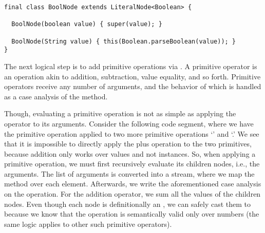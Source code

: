 \begin{lstlisting}[language=MyJava]
final class BoolNode extends LiteralNode<Boolean> {

  BoolNode(boolean value) { super(value); }

  BoolNode(String value) { this(Boolean.parseBoolean(value)); }
}
\end{lstlisting}

The next logical step is to add primitive operations via . 
A primitive operator is an operation akin to addition, subtraction, value equality, and so forth. 
Primitive operators receive any number of arguments, and the behavior of which is handled as a case analysis of the  method. 

Though, evaluating a primitive operation is not as simple as applying the operator to its arguments. 
Consider the following code segment, where we have the primitive operation \ttt{+} applied to two more primitive operations `\ttt{*}' and `\ttt{-}.' 
We see that it is impossible to directly apply the plus operation to the two primitives, because addition only works over  values and not  instances. 
So, when applying a primitive operation, we must first recursively evaluate its children nodes, i.e., the arguments. 
The list of arguments is converted into a stream, where we map the  method over each element. 
Afterwards, we write the aforementioned case analysis on the operation. 
For the addition operator, we sum all the values of the children nodes. 
Even though each node is definitionally an , we can safely cast them to  because we know that the operation is semantically valid only over numbers (the same logic applies to other such primitive operators).


